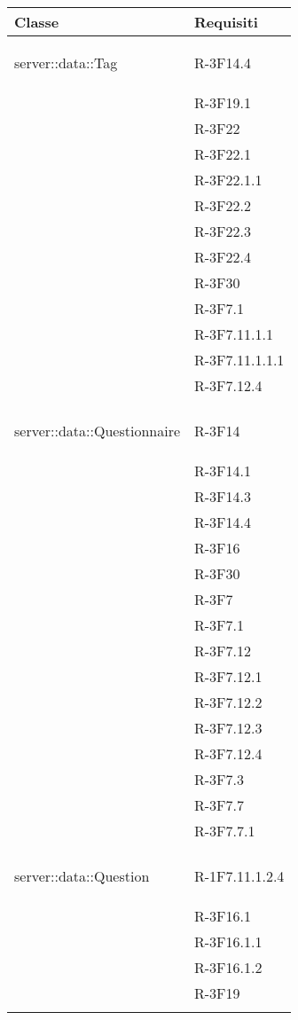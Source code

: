 \begin{longtable}{l p{3cm}}
\midrule
Classe & Requisiti\tabularnewline
\midrule
\hypertarget{server::data::Tag}{server::data::Tag} & R-3F14.4 \tabularnewline &

R-3F19.1 \tabularnewline &

R-3F22 \tabularnewline &

R-3F22.1 \tabularnewline &

R-3F22.1.1 \tabularnewline &

R-3F22.2 \tabularnewline &

R-3F22.3 \tabularnewline &

R-3F22.4 \tabularnewline &

R-3F30 \tabularnewline &

R-3F7.1 \tabularnewline &

R-3F7.11.1.1 \tabularnewline &

R-3F7.11.1.1.1 \tabularnewline &

R-3F7.12.4 \tabularnewline &\tabularnewline
\midrule
\hypertarget{server::data::Questionnaire}{server::data::Questionnaire} & R-3F14 \tabularnewline &

R-3F14.1 \tabularnewline &

R-3F14.3 \tabularnewline &

R-3F14.4 \tabularnewline &

R-3F16 \tabularnewline &

R-3F30 \tabularnewline &

R-3F7 \tabularnewline &

R-3F7.1 \tabularnewline &

R-3F7.12 \tabularnewline &

R-3F7.12.1 \tabularnewline &

R-3F7.12.2 \tabularnewline &

R-3F7.12.3 \tabularnewline &

R-3F7.12.4 \tabularnewline &

R-3F7.3 \tabularnewline &

R-3F7.7 \tabularnewline &

R-3F7.7.1 \tabularnewline &\tabularnewline
\midrule
\hypertarget{server::data::Question}{server::data::Question} & R-1F7.11.1.2.4 \tabularnewline &

R-3F16.1 \tabularnewline &

R-3F16.1.1 \tabularnewline &

R-3F16.1.2 \tabularnewline &

R-3F19 \tabularnewline &


\end{longtable}
